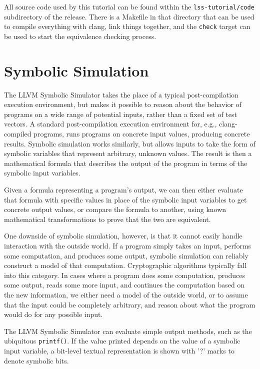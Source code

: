 \documentclass[11pt]{article}
\begin{document}
All source code used by this tutorial can be found within the
\texttt{lss-tutorial/code} subdirectory of the release.  There is a
Makefile in that directory that can be used to compile everything with
clang, link things together, and the \texttt{check} target can be used
to start the equivalence checking process.

\section{Symbolic Simulation}

The LLVM Symbolic Simulator takes the place of a typical
post-compilation execution environment, but makes it possible to reason
about the behavior of programs on a wide range of potential inputs,
rather than a fixed set of test vectors. A standard post-compilation
execution environment for, e.g., clang-compiled programs, runs programs
on concrete input values, producing concrete results. Symbolic
simulation works similarly, but allows inputs to take the form of
symbolic variables that represent arbitrary, unknown values. The result
is then a mathematical formula that describes the output of the program
in terms of the symbolic input variables.

Given a formula representing a program's output, we can then either
evaluate that formula with specific values in place of the symbolic
input variables to get concrete output values, or compare the formula to
another, using known mathematical transformations to prove that the two
are equivalent.

One downside of symbolic simulation, however, is that it cannot easily
handle interaction with the outside world. If a program simply takes an
input, performs some computation, and produces some output, symbolic
simulation can reliably construct a model of that computation.
Cryptographic algorithms typically fall into this category. In cases
where a program does some computation, produces some output, reads some
more input, and continues the computation based on the new information,
we either need a model of the outside world, or to assume that the input
could be completely arbitrary, and reason about what the program would
do for any possible input.

The LLVM Symbolic Simulator can evaluate simple output methods, such as
the ubiquitous \texttt{printf()}.  If the value printed depends on the
value of a symbolic input variable, a bit-level textual representation
is shown with '?' marks to denote symbolic bits.
\end{document}
